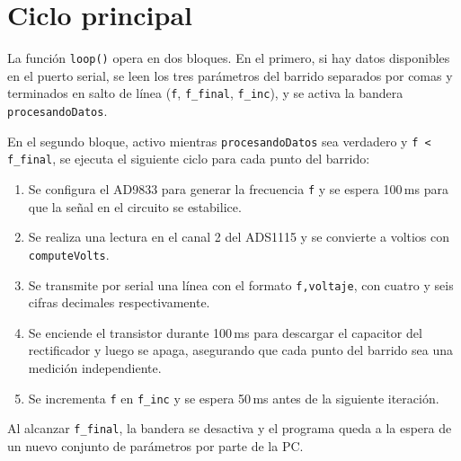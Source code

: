 \section{Ciclo principal}

La función \texttt{loop()} opera en dos bloques. En el primero, si hay datos disponibles en el puerto serial, se leen los tres parámetros del barrido separados por comas y terminados en salto de línea (\texttt{f}, \texttt{f\_final}, \texttt{f\_inc}), y se activa la bandera \texttt{procesandoDatos}.

En el segundo bloque, activo mientras \texttt{procesandoDatos} sea verdadero y \texttt{f\,<\,f\_final}, se ejecuta el siguiente ciclo para cada punto del barrido:

\begin{enumerate}
    \item Se configura el AD9833 para generar la frecuencia \texttt{f} y se espera 100\,ms para que la señal en el circuito se estabilice.
    \item Se realiza una lectura en el canal 2 del ADS1115 y se convierte a voltios con \texttt{computeVolts}.
    \item Se transmite por serial una línea con el formato \texttt{f,voltaje}, con cuatro y seis cifras decimales respectivamente.
    \item Se enciende el transistor durante 100\,ms para descargar el capacitor del rectificador y luego se apaga, asegurando que cada punto del barrido sea una medición independiente.
    \item Se incrementa \texttt{f} en \texttt{f\_inc} y se espera 50\,ms antes de la siguiente iteración.
\end{enumerate}

Al alcanzar \texttt{f\_final}, la bandera se desactiva y el programa queda a la espera de un nuevo conjunto de parámetros por parte de la PC.